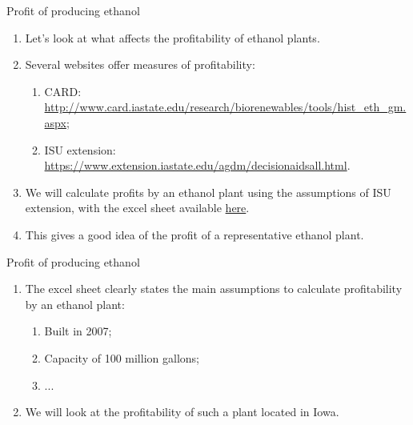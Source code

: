 \documentclass[table,xcolor=pdftex,dvipsnames]{beamer}\usepackage[]{graphicx}\usepackage[]{color}
\begin{document}
\begin{frame}{Profit of producing ethanol}
\begin{enumerate}[label=\textbullet]
    \item Let's look at what affects the profitability of ethanol plants.
    \item Several websites offer measures of profitability:
    \begin{enumerate}[label=-]
        \item CARD: \url{http://www.card.iastate.edu/research/biorenewables/tools/hist_eth_gm.aspx};
        \item ISU extension: \url{https://www.extension.iastate.edu/agdm/decisionaidsall.html}.
    \end{enumerate}
    \item We will calculate profits by an ethanol plant using the assumptions of ISU extension, with the excel sheet available \href{https://www.extension.iastate.edu/agdm/energy/xls/d1-10ethanolprofitability.xlsx}{here}.
    \item This gives a good idea of the profit of a representative ethanol plant.
\end{enumerate}
\end{frame}




\begin{frame}{Profit of producing ethanol}
\begin{enumerate}[label=\textbullet]
    \item The excel sheet clearly states the main assumptions to calculate profitability by an ethanol plant:
    \begin{enumerate}[label=-]
        \item Built in 2007;
        \item Capacity of 100 million gallons;
        \item ...
    \end{enumerate}
    \item We will look at the profitability of such a plant located in Iowa.
\end{enumerate}
\end{frame}

\end{document}
